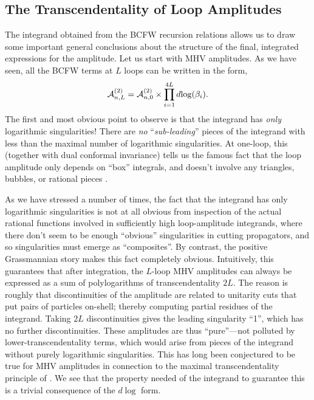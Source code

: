 \documentclass[12pt,hyperref,compress]{JHEP3}
\newcommand{\eq}[1]{\begin{equation}#1\end{equation}}
\begin{document}
\subsection{The Transcendentality of Loop Amplitudes}\label{transcendentality_of_loop_amplitudes_subsection}

The integrand obtained from the BCFW recursion relations allows us to draw some important general conclusions about the structure of the final, integrated expressions for the amplitude. Let us start with MHV amplitudes. As we have seen, all the BCFW terms at $L$ loops can be written in the form,
\vspace{-.2cm}\eq{{\cal A}^{(2)}_{n,L} = {\cal A}^{(2)}_{n,0}\times \prod_{i=1}^{4L} d\!\log(\beta_i).\vspace{-.2cm}}
The first and most obvious point to observe is that the integrand has {\it only} logarithmic singularities! There are {\it no} ``{\it sub-leading}'' pieces of the integrand with less than the maximal number of logarithmic singularities. At one-loop, this (together with dual conformal invariance) tells us the famous fact that the loop amplitude only depends on ``box'' integrals, and doesn't involve any triangles, bubbles, or rational pieces \cite{Bern:1992ad,Bern:1993tz}.

As we have stressed a number of times, the fact that the integrand has only logarithmic singularities is not at all obvious from inspection of the actual rational functions involved in sufficiently high loop-amplitude integrands, where there don't seem to be enough ``obvious'' singularities in cutting propagators, and so singularities must emerge as ``composites''. By contrast, the positive Grassmannian story makes this fact completely obvious.  Intuitively, this  guarantees that after integration, the $L$-loop MHV amplitudes can always be expressed as a sum of polylogarithms of transcendentality $2L$. The reason is roughly that discontinuities of the amplitude are related to unitarity cuts that put pairs of particles on-shell; thereby computing partial residues of the integrand. Taking $2L$ discontinuities gives the leading singularity ``1'', which has no further discontinuities. These amplitudes are thus ``pure''---not polluted by lower-transcendentality terms, which would arise from pieces of the integrand without purely logarithmic singularities. This has long been conjectured to be true for MHV amplitudes in connection to the maximal transcendentality principle of \cite{Kotikov:2002ab}. We see that the property needed of the integrand to guarantee this is a trivial consequence of the $d\!\log$ form.
\end{document}
